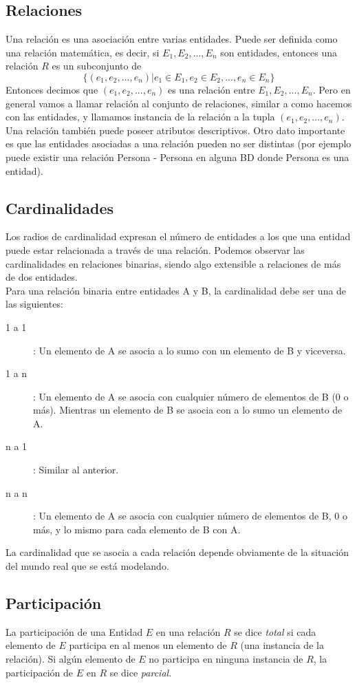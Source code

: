 \documentclass[a4paper]{article}
\begin{document}
\subsection{Relaciones}
Una relación es una asociación entre varias entidades. Puede ser definida como una relación
matemática, es decir, si $E_{1}, E_{2}, ..., E_{n}$ son entidades, entonces una relación $R$
es un subconjunto de
$$ \{ (e_{1},e_{2},...,e_{n}) | e_{1} \in E_{1}, e_{2} \in E_{2}, ..., e_{n} \in E_{n} \} $$
Entonces decimos que $(e_{1},e_{2},...,e_{n})$ es una relación entre $E_{1}, E_{2},..., E_{n}$.
Pero en general vamos a llamar relación al conjunto de relaciones, similar a como hacemos con
las entidades, y llamamos instancia de la relación a la tupla $(e_{1}, e_{2}, ..., e_{n})$. \\
Una relación también puede poseer atributos descriptivos. Otro dato importante es que las
entidades asociadas a una relación pueden no ser distintas (por ejemplo puede existir una
relación Persona - Persona en alguna BD donde Persona es una entidad).

\subsection{Cardinalidades}
Los radios de cardinalidad expresan el n\'umero de entidades a los que una entidad puede estar
relacionada a trav\'es de una relaci\'on. Podemos observar las cardinalidades en relaciones
binarias, siendo algo extensible a relaciones de m\'as de dos entidades. \\
Para una relaci\'on binaria entre entidades A y B, la cardinalidad debe ser una de las
siguientes:
\begin{description}
    \item[1 a 1]: Un elemento de A se asocia a lo sumo con un elemento de B y viceversa.
    \item[1 a n]: Un elemento de A se asocia con cualquier n\'umero de elementos de B
    (0 o m\'as). Mientras un elemento de B se asocia con a lo sumo un elemento de A.
    \item[n a 1]: Similar al anterior.
    \item[n a n]: Un elemento de A se asocia con cualquier n\'umero de elementos de B,
    0 o m\'as, y lo mismo para cada elemento de B con A.
\end{description}
La cardinalidad que se asocia a cada relaci\'on depende obviamente de la situaci\'on del
mundo real que se est\'a modelando.

\subsection{Participaci\'on}
La participaci\'on de una Entidad $E$ en una relaci\'on $R$ se dice \textit{total} si cada
elemento de $E$ participa en al menos un elemento de $R$ (una instancia de la relaci\'on).
Si alg\'un elemento de $E$ no participa en ninguna instancia de $R$, la participaci\'on de
$E$ en $R$ se dice \textit{parcial}.
\end{document}

